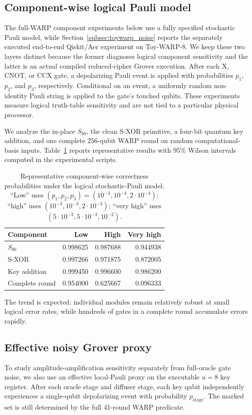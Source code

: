 \documentclass[pdflatex,sn-nature]{sn-jnl}
\theoremstyle{thmstyleone}
\theoremstyle{thmstyletwo}
\begin{document}
\subsection{Component-wise logical Pauli model}
The full-WARP component experiments below use a fully specified stochastic Pauli model, while Section~\ref{subsec:toywarp_noise} reports the separately executed end-to-end Qiskit/Aer experiment on Toy-WARP-8. We keep these two layers distinct because the former diagnoses logical component sensitivity and the latter is an actual compiled reduced-cipher Grover execution. After each X, CNOT, or CCX gate, a depolarizing Pauli event is applied with probabilities $p_1$, $p_2$, and $p_3$, respectively. Conditional on an event, a uniformly random non-identity Pauli string is applied to the gate's touched qubits. These experiments measure logical truth-table sensitivity and are not tied to a particular physical processor.

We analyze the in-place $S_{b0}$, the clean S-XOR primitive, a four-bit quantum key addition, and one complete 256-qubit WARP round on random computational-basis inputs. Table~\ref{tab:component_noise} reports representative results with 95\% Wilson intervals computed in the experimental scripts.

\begin{table}[t]
\centering
\caption{Representative component-wise correctness probabilities under the logical stochastic-Pauli model. ``Low'' uses $(p_1,p_2,p_3)=(10^{-4},10^{-4},2\cdot10^{-4})$; ``high'' uses $(10^{-3},10^{-3},2\cdot10^{-3})$; ``very high'' uses $(5\cdot10^{-3},5\cdot10^{-3},10^{-2})$.}
\label{tab:component_noise}
\begin{tabular}{lrrr}
\toprule
Component & Low & High & Very high\\
\midrule
$S_{b0}$ & 0.998625 & 0.987688 & 0.944938\\
S-XOR & 0.997266 & 0.971875 & 0.872005\\
Key addition & 0.999450 & 0.996600 & 0.986200\\
Complete round & 0.954000 & 0.625667 & 0.096333\\
\bottomrule
\end{tabular}
\end{table}

The trend is expected: individual modules remain relatively robust at small logical error rates, while hundreds of gates in a complete round accumulate errors rapidly.

\subsection{Effective noisy Grover proxy}
To study amplitude-amplification sensitivity separately from full-oracle gate noise, we also use an effective local-Pauli proxy on the executable $u=8$ key register. After each oracle stage and diffuser stage, each key qubit independently experiences a single-qubit depolarizing event with probability $p_{\mathrm{stage}}$. The marked set is still determined by the full 41-round WARP predicate.
\end{document}
